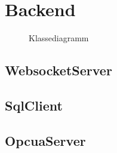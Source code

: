 \section{Backend}\label{sec:poc:backend}
\begin{figure}[ht]
  \centering
  \caption[Klassediagramm Backend]{Klassediagramm}
  \label{fig:backend:classDiag}
\end{figure}

\subsection{WebsocketServer}
\subsection{SqlClient}
\subsection{OpcuaServer}

